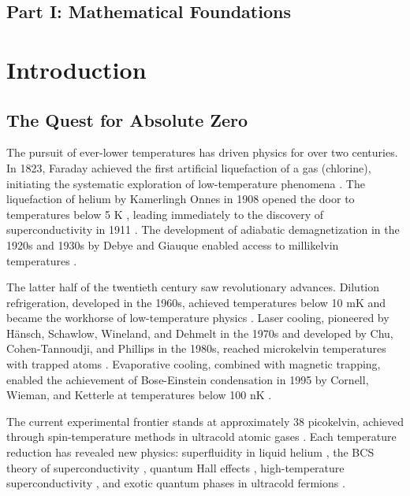 
\subsection*{Part I: Mathematical Foundations}

\section{Introduction}

\subsection{The Quest for Absolute Zero}

The pursuit of ever-lower temperatures has driven physics for over two centuries. In 1823, Faraday achieved the first artificial liquefaction of a gas (chlorine), initiating the systematic exploration of low-temperature phenomena \cite{faraday1823}. The liquefaction of helium by Kamerlingh Onnes in 1908 opened the door to temperatures below 5 K \cite{onnes1908}, leading immediately to the discovery of superconductivity in 1911 \cite{onnes1911}. The development of adiabatic demagnetization in the 1920s and 1930s by Debye and Giauque enabled access to millikelvin temperatures \cite{debye1926,giauque1927}.

The latter half of the twentieth century saw revolutionary advances. Dilution refrigeration, developed in the 1960s, achieved temperatures below 10 mK and became the workhorse of low-temperature physics \cite{london1951,das1965}. Laser cooling, pioneered by H\"{a}nsch, Schawlow, Wineland, and Dehmelt in the 1970s and developed by Chu, Cohen-Tannoudji, and Phillips in the 1980s, reached microkelvin temperatures with trapped atoms \cite{hansch1975,wineland1978,chu1985,phillips1985}. Evaporative cooling, combined with magnetic trapping, enabled the achievement of Bose-Einstein condensation in 1995 by Cornell, Wieman, and Ketterle at temperatures below 100 nK \cite{anderson1995,davis1995,ketterle1996}.

The current experimental frontier stands at approximately 38 picokelvin, achieved through spin-temperature methods in ultracold atomic gases \cite{medley2011}. Each temperature reduction has revealed new physics: superfluidity in liquid helium \cite{kapitza1938,allen1938}, the BCS theory of superconductivity \cite{bardeen1957}, quantum Hall effects \cite{klitzing1980,tsui1982}, high-temperature superconductivity \cite{bednorz1986}, and exotic quantum phases in ultracold fermions \cite{demarco1999,regal2004,zwierlein2005}.

